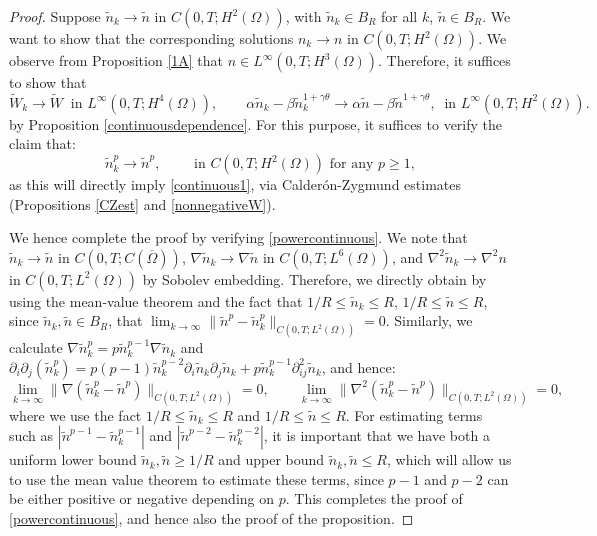 \documentclass[12pt]{article}
\theoremstyle{plain}
\begin{document}
\begin{proof}
    Suppose $\tilde{n}_{k} \to \tilde{n}$ in $C(0, T; H^{2}(\Omega))$, with $\tilde{n}_{k} \in B_{R}$ for all $k$, $\tilde{n} \in B_{R}$. We want to show that the corresponding solutions $n_{k} \to n$ in $C(0, T; H^{2}(\Omega))$. We observe from Proposition \ref{1A} that $n \in L^{\infty}(0, T; H^{3}(\Omega))$. Therefore, it suffices to show that
    \begin{equation}\label{continuous1}
        \tilde{W}_{k} \to \tilde{W} \ \text{ in } L^{\infty}(0, T; H^{4}(\Omega)), \qquad 
        \alpha \tilde{n}_{k} - \beta \tilde{n}_{k}^{1 + \gamma \theta} \to \alpha \tilde{n} - \beta \tilde{n}^{1 + \gamma \theta}, \ \text{ in } L^{\infty}(0, T; H^{2}(\Omega)).
    \end{equation}
    by Proposition \ref{continuousdependence}. For this purpose, it suffices to verify the claim that:
    \begin{equation}\label{powercontinuous}
    \tilde{n}_{k}^{p} \to \tilde{n}^{p}, \qquad \text{ in } C(0, T; H^{2}(\Omega)) \text{ for any } p \ge 1,
    \end{equation}
    as this will directly imply \eqref{continuous1}, via Calder\'{o}n-Zygmund estimates (Propositions \ref{CZest} and \ref{nonnegativeW}).

    We hence complete the proof by verifying \eqref{powercontinuous}. We note that $\tilde{n}_{k} \to \tilde{n}$ in $C(0, T; C(\overline{\Omega}))$, $\nabla \tilde{n}_{k} \to \nabla \tilde{n}$ in $C(0, T; L^{6}(\Omega))$, and $\nabla^{2} \tilde{n}_{k} \to \nabla^{2} n$ in $C(0, T; L^{2}(\Omega))$ by Sobolev embedding. Therefore, we directly obtain by using the mean-value theorem and the fact that $1/R \le \tilde{n}_{k} \le R$, $1/R \le \tilde{n} \le R$, since $\tilde{n}_{k}, \tilde{n} \in B_{R}$, that $\lim_{k \to \infty} \|\tilde{n}^{p} - \tilde{n}_{k}^{p}\|_{C(0, T; L^{2}(\Omega))} = 0$. Similarly, we calculate $\nabla \tilde{n}_{k}^{p} = p\tilde{n}_{k}^{p - 1} \nabla \tilde{n}_{k}$ and $\partial_{i}\partial_{j} (\tilde{n}_{k}^{p}) = p(p - 1) \tilde{n}^{p - 2}_{k} \partial_{i}\tilde{n}_{k} \partial_{j} \tilde{n}_{k} + p\tilde{n}_{k}^{p - 1} \partial^{2}_{ij} \tilde{n}_{k}$, and hence:
    \begin{equation*}
    \lim_{k \to \infty} \|\nabla(\tilde{n}_{k}^{p} - \tilde{n}^{p})\|_{C(0, T; L^{2}(\Omega))} = 0, \qquad \lim_{k \to \infty} \|\nabla^{2}(\tilde{n}_{k}^{p} - \tilde{n}^{p})\|_{C(0, T; L^{2}(\Omega))} = 0,
    \end{equation*}
    where we use the fact $1/R \le \tilde{n}_{k} \le R$ and $1/R \le \tilde{n} \le R$. For estimating terms such as $|\tilde{n}^{p - 1} - \tilde{n}_{k}^{p - 1}|$ and $|\tilde{n}^{p - 2} - \tilde{n}_{k}^{p - 2}|$, it is important that we have both a uniform lower bound $\tilde{n}_{k}, \tilde{n} \ge 1/R$ and upper bound $\tilde{n}_{k}, \tilde{n} \le R$, which will allow us to use the mean value theorem to estimate these terms, since $p - 1$ and $p - 2$ can be either positive or negative depending on $p$. This completes the proof of \eqref{powercontinuous}, and hence also the proof of the proposition.
\end{proof}
\end{document}
